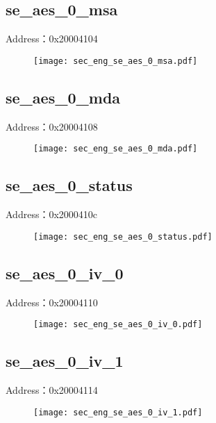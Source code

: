 \subsection{se\_aes\_0\_msa}
\label{sec_eng-se-aes-0-msa}
Address：0x20004104
 \begin{figure}[H]
\texttt{[image: sec\_eng\_se\_aes\_0\_msa.pdf]}
\end{figure}

\subsection{se\_aes\_0\_mda}
\label{sec_eng-se-aes-0-mda}
Address：0x20004108
 \begin{figure}[H]
\texttt{[image: sec\_eng\_se\_aes\_0\_mda.pdf]}
\end{figure}

\subsection{se\_aes\_0\_status}
\label{sec_eng-se-aes-0-status}
Address：0x2000410c
 \begin{figure}[H]
\texttt{[image: sec\_eng\_se\_aes\_0\_status.pdf]}
\end{figure}

\subsection{se\_aes\_0\_iv\_0}
\label{sec_eng-se-aes-0-iv-0}
Address：0x20004110
 \begin{figure}[H]
\texttt{[image: sec\_eng\_se\_aes\_0\_iv\_0.pdf]}
\end{figure}

\subsection{se\_aes\_0\_iv\_1}
\label{sec_eng-se-aes-0-iv-1}
Address：0x20004114
 \begin{figure}[H]
\texttt{[image: sec\_eng\_se\_aes\_0\_iv\_1.pdf]}
\end{figure}

